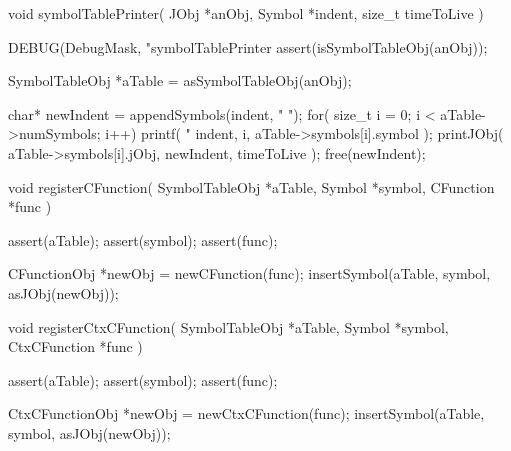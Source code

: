 void symbolTablePrinter(
  JObj   *anObj,
  Symbol *indent,
  size_t  timeToLive
) {
  DEBUG(DebugMask, "symbolTablePrinter %
  assert(isSymbolTableObj(anObj));
  
  SymbolTableObj *aTable = asSymbolTableObj(anObj);
  
  char* newIndent = appendSymbols(indent, "  ");
  for( size_t i = 0; i < aTable->numSymbols; i++) {
    printf(
      "%
      indent,
      i,
      aTable->symbols[i].symbol
    );
    printJObj(
      aTable->symbols[i].jObj,
      newIndent,
      timeToLive
    );
  }
  free(newIndent);
}

void registerCFunction(
  SymbolTableObj *aTable,
  Symbol         *symbol,
  CFunction      *func
) {
  assert(aTable);
  assert(symbol);
  assert(func);
  
  CFunctionObj *newObj = newCFunction(func);
  insertSymbol(aTable, symbol, asJObj(newObj));
}

void registerCtxCFunction(
  SymbolTableObj *aTable,
  Symbol         *symbol,
  CtxCFunction   *func
) {
  assert(aTable);
  assert(symbol);
  assert(func);
  
  CtxCFunctionObj *newObj = newCtxCFunction(func);
  insertSymbol(aTable, symbol, asJObj(newObj));
}

\stopCCode

